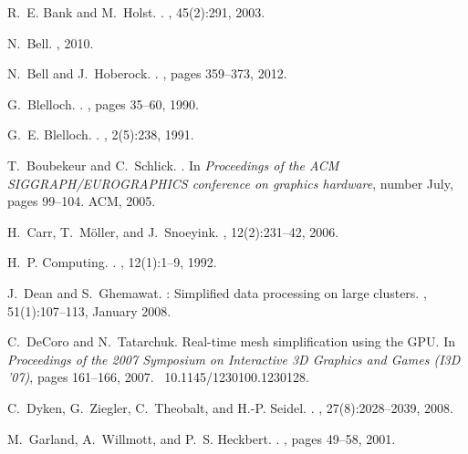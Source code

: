 \documentclass[10pt,journal,cspaper,compsoc]{IEEEtran}
\begin{document}
\begin{thebibliography}{10}

R.~E. Bank and M.~Holst.
.
, 45(2):291, 2003.

N.~Bell.
, 2010.

N.~Bell and J.~Hoberock.
.
, pages 359--373, 2012.

G.~Blelloch.
.
, pages 35--60, 1990.

G.~E. Blelloch.
.
, 2(5):238, 1991.

T.~Boubekeur and C.~Schlick.
.
\newblock In {\em Proceedings of the ACM SIGGRAPH/EUROGRAPHICS conference on
  graphics hardware}, number July, pages 99--104. ACM, 2005.

H.~Carr, T.~M\"{o}ller, and J.~Snoeyink.
,
  12(2):231--42, 2006.

H.~P. Computing.
.
, 12(1):1--9, 1992.

J.~Dean and S.~Ghemawat.
: Simplified data processing on large clusters.
, 51(1):107--113, January 2008.

C.~DeCoro and N.~Tatarchuk.
\newblock Real-time mesh simplification using the {GPU}.
\newblock In {\em Proceedings of the 2007 Symposium on Interactive 3D Graphics
  and Games (I3D '07)}, pages 161--166, 2007.
~10.1145/1230100.1230128.

C.~Dyken, G.~Ziegler, C.~Theobalt, and H.-P. Seidel.
.
, 27(8):2028--2039, 2008.

M.~Garland, A.~Willmott, and P.~S. Heckbert.
.
, pages 49--58, 2001.


\end{thebibliography}
\end{document}
